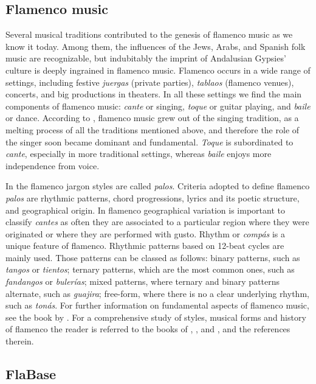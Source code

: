 \subsection{Flamenco music}
\label{sec:musicology:flamenco}

Several musical traditions contributed to the genesis of flamenco music as we know it today. Among them, the influences of the Jews, Arabs, and Spanish folk music are recognizable, but indubitably  the imprint of Andalusian Gypsies' culture is deeply ingrained in flamenco music. 
Flamenco occurs in a wide range of settings, including festive \textit{juergas} (private parties), \textit{tablaos} (flamenco venues), concerts, and big productions in theaters. In all these settings we find the main components of flamenco music: \textit{cante} or singing, \textit{toque} or guitar playing, and \textit{baile} or dance. According to \cite{gamboa-05}, flamenco music grew out of the singing tradition, as a melting process of all the traditions mentioned above, and therefore the role of the singer soon became dominant and fundamental. \textit{Toque}  is subordinated to \textit{cante}, especially in more traditional settings, whereas \textit{baile} enjoys more independence from voice. 

In the flamenco jargon styles are called \textit{palos}. Criteria adopted to define flamenco \textit{palos} are rhythmic patterns, chord progressions, lyrics and its poetic structure, and geographical origin. In flamenco geographical variation is important to classify \textit{cantes} as often they are associated to a particular region where they were originated or where they are performed with gusto. 
Rhythm or \textit{comp\'as} is a unique feature of flamenco.
Rhythmic patterns based on 12-beat cycles are mainly used. Those patterns can be classed as follows: binary patterns, such as \textit{tangos} or \textit{tientos}; ternary patterns, which are the most common ones, such as \textit{fandangos} or \textit{buler\'ias}; mixed patterns, where ternary and binary patterns alternate, such as \textit{guajira}; free-form, where there is no a clear underlying rhythm, such as \textit{ton\'as}.
For further information on fundamental aspects of flamenco music, see the book by \cite{fer-04}. For a comprehensive study of styles, musical forms and history of flamenco the reader is referred to the books of \cite{bvrr-88}, \cite{nr-95}, and \cite{gamboa-05}, and the references therein.


\subsection{FlaBase}
\label{sec:musicology:flabase}

